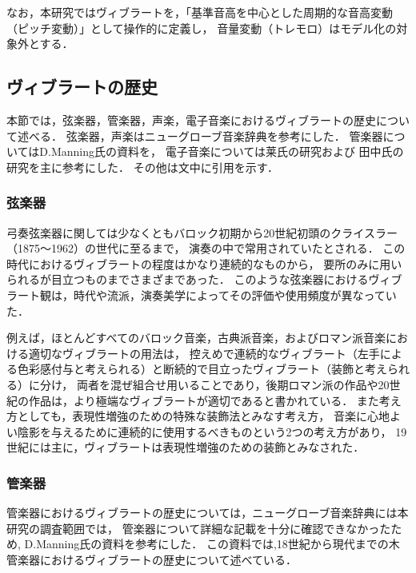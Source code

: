 なお，本研究ではヴィブラートを，「基準音高を中心とした周期的な音高変動（ピッチ変動）」として操作的に定義し，
音量変動（トレモロ）はモデル化の対象外とする．



\subsection{ヴィブラートの歴史}

本節では，弦楽器，管楽器，声楽，電子音楽におけるヴィブラートの歴史について述べる．
弦楽器，声楽はニューグローブ音楽辞典\cite{Niyugurovu}を参考にした．
管楽器についてはD.Manning氏\cite{manning95}の資料を，
電子音楽については莱氏の研究\cite{Rai2009}および
田中氏の研究\cite{Tanaka16}を主に参考にした．
その他は文中に引用を示す．

\subsubsection{弦楽器}

弓奏弦楽器に関しては少なくともバロック初期から20世紀初頭のクライスラー（1875～1962）の世代に至るまで，
演奏の中で常用されていたとされる．
この時代におけるヴィブラートの程度はかなり連続的なものから，
要所のみに用いられるが目立つものまでさまざまであった．
このような弦楽器におけるヴィブラート観は，時代や流派，演奏美学によってその評価や使用頻度が異なっていた．

例えば，ほとんどすべてのバロック音楽，古典派音楽，およびロマン派音楽における適切なヴィブラートの用法は，
控えめで連続的なヴィブラート（左手による色彩感付与と考えられる）と断続的で目立ったヴィブラート（装飾と考えられる）に分け，
両者を混ぜ組合せ用いることであり，後期ロマン派の作品や20世紀の作品は，より極端なヴィブラートが適切であると書かれている．
また考え方としても，表現性増強のための特殊な装飾法とみなす考え方，
音楽に心地よい陰影を与えるために連続的に使用するべきものという2つの考え方があり，
19世紀には主に，ヴィブラートは表現性増強のための装飾とみなされた．

\subsubsection{管楽器}

管楽器におけるヴィブラートの歴史については，ニューグローブ音楽辞典には本研究の調査範囲では，
管楽器について詳細な記載を十分に確認できなかったため,
D.Manning氏\cite{manning95}の資料を参考にした．
この資料では,18世紀から現代までの木管楽器におけるヴィブラートの歴史について述べている．

